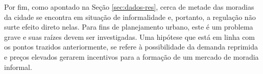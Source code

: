 Por fim, como apontado na Seção \ref{sec:dados-res}, cerca de metade das moradias da cidade se encontra em situação de informalidade e, portanto, a regulação não surte efeito direto nelas. Para fins de planejamento urbano, este é um problema grave e suas raízes devem ser investigadas. Uma hipótese que está em linha com os pontos trazidos anteriormente, se refere à possibilidade da demanda reprimida e preços elevados gerarem incentivos para a formação de um mercado de moradia informal.





